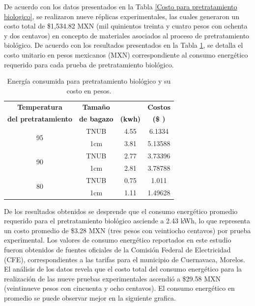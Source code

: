 \documentclass[12pt]{article}
\begin{document}
De acuerdo con los datos presentados en la Tabla \ref{Costo para pretratamiento biologico}, se realizaron nueve réplicas experimentales, las cuales generaron un costo total de \$1,534.82 MXN (mil quinientos treinta y cuatro pesos con ochenta y dos centavos) en concepto de materiales asociados al proceso de pretratamiento biológico.
De acuerdo con los resultados presentados en la Tabla \ref{tabla de energia}, se detalla el costo unitario en pesos mexicanos (MXN) correspondiente al consumo energético requerido para cada prueba de pretratamiento biológico.
	
	
	\begin{table}[H]
		\centering
		\caption{Energía consumida para pretratamiento biológico  y su costo en pesos. }
		\label{tabla de energia}
	{\fontsize{9}{10.8}\selectfont
		\begin{tabular}{|c|c|c|c|}
			\hline
			\textbf{Temperatura} & \textbf{Tamaño }  & \textbf{
			} & \textbf{Costos } \\ 
			\textbf{del pretratamiento} &	\textbf{ de bagazo}  & 	\textbf{(kwh) }& 	\textbf{(\$ )} \\ \hline
       \multirow{2}{*}{95} & TNUB & 4.55 & 6.1334  \\ \cline{2-4}
	 & 1cm & 3.81 & 5.13588  \\ \hline
\multirow{2}{*}{90} & TNUB & 2.77 & 3.73396  \\ \cline{2-4}
	 & 1cm & 2.81 & 3.78788  \\ \hline
\multirow{2}{*}{80}	 & TNUB & 0.75 & 1.011  \\ \cline{2-4}
	 & 1cm & 1.11 & 1.49628  \\ 	\hline		
		\end{tabular}}
	
	\end{table}
	
	
De los resultados obtenidos se desprende que el consumo energético promedio requerido para el pretratamiento biológico asciende a 2.43 kWh, lo que representa un costo promedio de \$3.28 MXN (tres pesos con veintiocho centavos) por prueba experimental. Los valores de consumo energético reportados en este estudio fueron obtenidos de fuentes oficiales de la Comisión Federal de Electricidad (CFE), correspondientes a las tarifas para el municipio de Cuernavaca, Morelos. El análisis de los datos revela que el costo total del consumo energético para la realización de las nueve pruebas experimentales ascendió a \$29.58 MXN (veintinueve pesos con cincuenta y ocho centavos).
	El consumo energético en promedio se puede observar mejor en la siguiente grafica.
	
\end{document}
